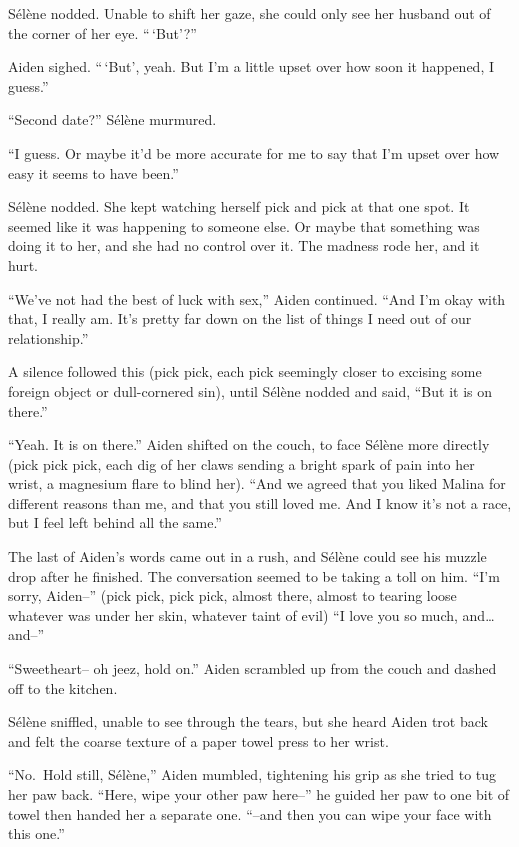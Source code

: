 Sélène nodded. Unable to shift her gaze, she could only see her husband out of the corner of her eye. ``\,`But'?''

Aiden sighed. ``\,`But', yeah. But I'm a little upset over how soon it happened, I guess.''

``Second date?'' Sélène murmured.

``I guess. Or maybe it'd be more accurate for me to say that I'm upset over how easy it seems to have been.''

Sélène nodded. She kept watching herself pick and pick at that one spot. It seemed like it was happening to someone else. Or maybe that something was doing it to her, and she had no control over it. The madness rode her, and it hurt.

``We've not had the best of luck with sex,'' Aiden continued. ``And I'm okay with that, I really am. It's pretty far down on the list of things I need out of our relationship.''

A silence followed this (pick pick, each pick seemingly closer to excising some foreign object or dull-cornered sin), until Sélène nodded and said, ``But it is on there.''

``Yeah. It is on there.'' Aiden shifted on the couch, to face Sélène more directly (pick pick pick, each dig of her claws sending a bright spark of pain into her wrist, a magnesium flare to blind her). ``And we agreed that you liked Malina for different reasons than me, and that you still loved me. And I know it's not a race, but I feel left behind all the same.''

The last of Aiden's words came out in a rush, and Sélène could see his muzzle drop after he finished. The conversation seemed to be taking a toll on him. ``I'm sorry, Aiden--'' (pick pick, pick pick, almost there, almost to tearing loose whatever was under her skin, whatever taint of evil) ``I love you so much, and\ldots{}and--''

``Sweetheart-- oh jeez, hold on.'' Aiden scrambled up from the couch and dashed off to the kitchen.

Sélène sniffled, unable to see through the tears, but she heard Aiden trot back and felt the coarse texture of a paper towel press to her wrist.

``No.~Hold still, Sélène,'' Aiden mumbled, tightening his grip as she tried to tug her paw back. ``Here, wipe your other paw here--'' he guided her paw to one bit of towel then handed her a separate one. ``--and then you can wipe your face with this one.''

